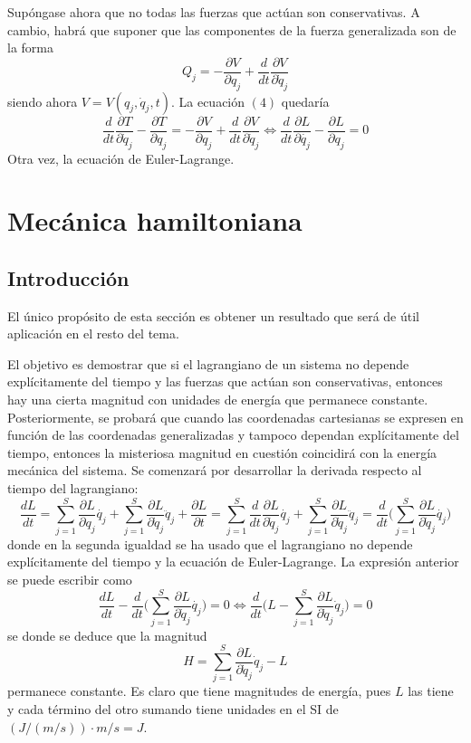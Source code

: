\documentclass[12pt]{report}
\begin{document}
\vspace{2mm}
Supóngase ahora que no todas las fuerzas que actúan son conservativas. A cambio, habrá que suponer que las componentes de la fuerza generalizada son de la forma
\[Q_j = -\frac{\partial V}{\partial q_j}+\frac{d}{dt}\frac{\partial V}{\partial \dot{q}_j}\]
siendo ahora $V = V(q_j,\dot{q}_j,t)$. La ecuación $(4)$ quedaría
\[\frac{d}{dt}\frac{\partial T}{\partial \dot{q}_j}-\frac{\partial T}{\partial q_j} = -\frac{\partial V}{\partial q_j}+\frac{d}{dt}\frac{\partial V}{\partial \dot{q}_j} \iff \frac{d}{dt}\frac{\partial L}{\partial \dot{q_j}}-\frac{\partial L}{\partial q_j} = 0\]
Otra vez, la ecuación de Euler-Lagrange.

\chapter{Mecánica hamiltoniana}

\section{Introducción}

El único propósito de esta sección es obtener un resultado que será de útil aplicación en el resto del tema.

\vspace{2mm}
El objetivo es demostrar que si el lagrangiano de un sistema no depende explícitamente del tiempo y las fuerzas que actúan son conservativas, entonces hay una cierta magnitud con unidades de energía que permanece constante. Posteriormente, se probará que cuando las coordenadas cartesianas se expresen en función de las coordenadas generalizadas y tampoco dependan explícitamente del tiempo, entonces la misteriosa magnitud en cuestión coincidirá con la energía mecánica del sistema. Se comenzará por desarrollar la derivada respecto al tiempo del lagrangiano:
\[\frac{dL}{dt} = \sum_{j=1}^S \frac{\partial L}{\partial q_j} \dot{q_j} + \sum_{j=1}^S \frac{\partial L}{\partial \dot{q}_j} \ddot{q}_j + \frac{\partial L}{\partial t} = \sum_{j=1}^S \frac{d}{dt} \frac{\partial L}{\partial \dot{q}_j} \dot{q_j} + \sum_{j=1}^S \frac{\partial L}{\partial \dot{q}_j} \ddot{q}_j = \frac{d}{dt}\biggl( \sum_{j=1}^S \frac{\partial L}{\partial \dot{q}_j} \dot{q_j} \biggr)\]
donde en la segunda igualdad se ha usado que el lagrangiano no depende explícitamente del tiempo y la ecuación de Euler-Lagrange. La expresión anterior se puede escribir como
\[\frac{dL}{dt}-\frac{d}{dt}\biggl( \sum_{j=1}^S \frac{\partial L}{\partial \dot{q}_j} \dot{q_j} \biggr) = 0 \iff \frac{d}{dt} \biggl( L - \sum_{j=1}^S \frac{\partial L}{\partial \dot{q}_j} \dot{q}_j \biggr) = 0\]
se donde se deduce que la magnitud
\[H = \sum_{j=1}^S {\frac{\partial L}{\partial \dot{q}_j}} \dot{q}_j - L \tag{1} \]
permanece constante. Es claro que tiene magnitudes de energía, pues $L$ las tiene y cada término del otro sumando tiene unidades en el SI de $(J / (m/s)) \cdot m/s = J$.
\end{document}
